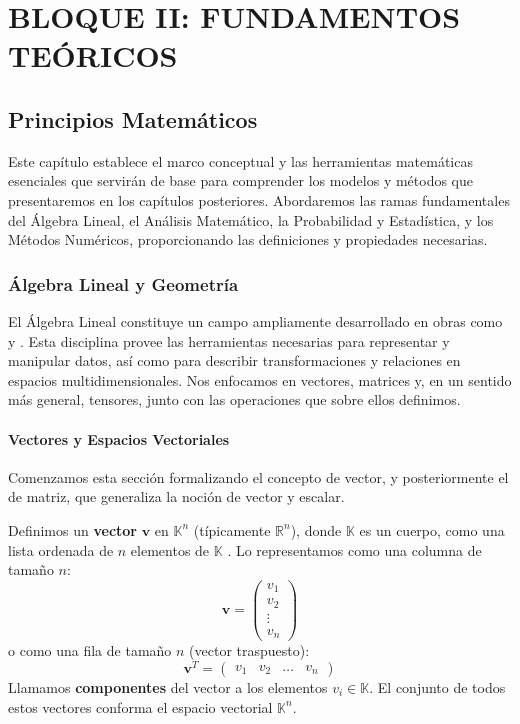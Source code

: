 \part{BLOQUE II: FUNDAMENTOS TEÓRICOS}

\chapter{Principios Matemáticos}
\label{ch:math_foundations}
\glsresetall

Este capítulo establece el marco conceptual y las herramientas matemáticas esenciales que servirán de base para comprender los modelos y métodos que presentaremos en los capítulos posteriores. Abordaremos las ramas fundamentales del Álgebra Lineal, el Análisis Matemático, la Probabilidad y Estadística, y los Métodos Numéricos, proporcionando las definiciones y propiedades necesarias.

\section{Álgebra Lineal y Geometría}
\label{sec:linear_algebra_geometry}

El Álgebra Lineal constituye un campo ampliamente desarrollado en obras como  \citet{Strang2016} y \citet{Noble1988}. Esta disciplina provee las herramientas necesarias para representar y manipular datos, así como para describir transformaciones y relaciones en espacios multidimensionales. Nos enfocamos en vectores, matrices y, en un sentido más general, tensores, junto con las operaciones que sobre ellos definimos.

\subsection{Vectores y Espacios Vectoriales}
\label{subsec:vectors_vector_spaces}

Comenzamos esta sección formalizando el concepto de vector, y posteriormente el de matriz, que generaliza la noción de vector y escalar.

\begin{definition}[Vector]
\label{def:vector}
Definimos un \textbf{vector} $\mathbf{v}$ en $\mathbb{K}^n$ (típicamente $\mathbb{R}^n$), donde $\mathbb{K}$ es un cuerpo, como una lista ordenada de $n$ elementos de $\mathbb{K}$ \citep{Strang2016}. Lo representamos como una columna de tamaño $n$:
\[ \mathbf{v} = \begin{pmatrix} v_1 \\ v_2 \\ \vdots \\ v_n \end{pmatrix} \]
o como una fila de tamaño $n$ (vector traspuesto):
\[ \mathbf{v}^T = \begin{pmatrix} v_1 & v_2 & \dots & v_n \end{pmatrix} \]
Llamamos \textbf{componentes} del vector a los elementos $v_i \in \mathbb{K}$. El conjunto de todos estos vectores conforma el espacio vectorial $\mathbb{K}^n$.
\end{definition}

